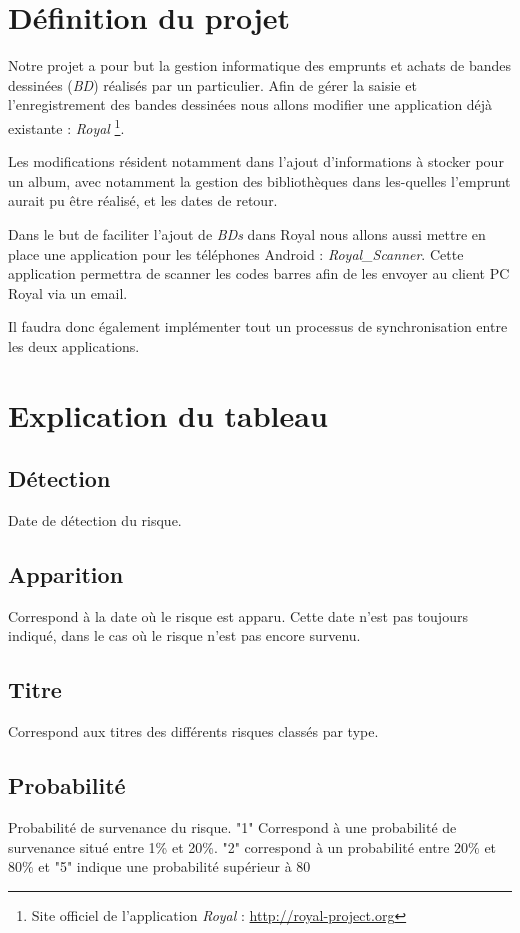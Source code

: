 \documentclass[etudiants]{support-iutrs}
\begin{document}
\header
\section*{Définition du projet}

Notre projet a pour but la gestion informatique des emprunts et achats de bandes dessinées (\emph{BD}) réalisés par un particulier.
Afin de gérer la saisie et l'enregistrement des bandes dessinées nous allons modifier une application déjà existante : \emph{Royal}
\footnote{Site officiel de l'application \emph{Royal} : \url{http://royal-project.org}}.

Les modifications résident notamment dans l'ajout d'informations à stocker pour un album, avec notamment la gestion des bibliothèques dans les-quelles l'emprunt aurait pu être réalisé, et les dates de retour. 

Dans le but de faciliter l'ajout de \emph{BDs} dans Royal nous allons aussi mettre en place une application pour les téléphones Android : \emph{Royal\_Scanner}.
Cette application permettra de scanner les codes barres afin de les envoyer au client PC Royal via un email.

Il faudra donc également implémenter tout un processus de synchronisation entre les deux applications. 

\section*{Explication du tableau}

\subsection{Détection}
Date de détection du risque.

\subsection{Apparition}
Correspond à la date où le risque est apparu. Cette date n'est pas toujours indiqué, dans le cas où le risque n'est pas encore survenu.

\subsection{Titre}
Correspond aux titres des différents risques classés par type.

\subsection{Probabilité}
Probabilité de survenance du risque. "1" Correspond à une probabilité de survenance situé entre 1\% et 20\%. "2" correspond à un probabilité entre 20\% et 80\% et "5" indique une probabilité supérieur à 80%
\end{document}
